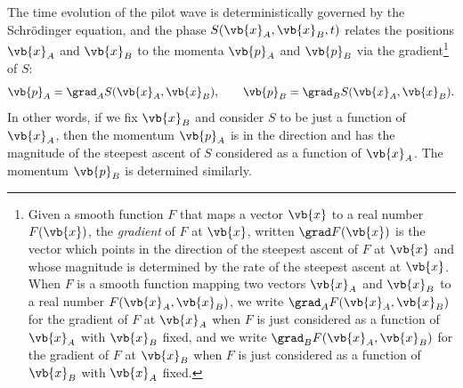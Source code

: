 \documentclass[12pt]{report}
\begin{document}
The time evolution of the pilot wave is deterministically governed by the Schr\"{o}dinger equation, and the phase $S(\vb{x}_A, \vb{x}_B, t )$ relates the positions $\vb{x}_A$ and $\vb{x}_B$ to the momenta $\vb{p}_A$ and $\vb{p}_B$ via the gradient\footnote{Given a smooth function $F$ that maps a vector $\vb{x}$ to a real number $F(\vb{x})$, the \emph{gradient} of $F$ at $\vb{x}$, written $\grad F(\vb{x})$ is the vector which points in the direction of the steepest ascent of $F$ at $\vb{x}$ and whose magnitude is determined by the rate of the steepest ascent at $\vb{x}$. When $F$ is a smooth function mapping two vectors $\vb{x}_A$ and $\vb{x}_B$ to a real number $F(\vb{x}_A, \vb{x}_B)$, we write $\grad_A F(\vb{x}_A, \vb{x}_B)$ for the gradient of $F$ at $\vb{x}_A$ when $F$ is just considered as a function of $\vb{x}_A$ with $\vb{x}_B$ fixed, and we write $\grad_B F(\vb{x}_A, \vb{x}_B)$ for the gradient of $F$ at $\vb{x}_B$ when $F$ is just considered as a function of $\vb{x}_B$ with $\vb{x}_A$ fixed.} of $S$:
\begin{equation}
\vb{p}_A=\grad_A{S}(\vb{x}_A, \vb{x}_B),\qquad
\vb{p}_B=\grad_B{S}(\vb{x}_A, \vb{x}_B).
\end{equation}
In other words, %
%
if we fix $\vb{x}_B$ %
%
and consider $S$ to be just a function of $\vb{x}_A$, then the momentum $\vb{p}_A$ is in the direction and has the magnitude of the steepest ascent of $S$ considered as a function of $\vb{x}_A$. The momentum $\vb{p}_B$ is determined similarly. 
\end{document}
